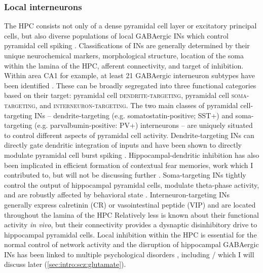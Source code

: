 \subsubsection{Local interneurons}
\label{sec:intro:memory:INs}
The \ac{HPC} consists not only of a dense pyramidal cell layer or excitatory principal cells, but also diverse populations of local GABAergic \ac{INs} which control pyramidal cell spiking \citep{Freund1996}.
Classifications of \ac{INs} are generally determined by their unique neurochemical markers, morphological structure, location of the soma within the lamina of the \ac{HPC}, afferent connectivity, and target of inhibition.
Within area CA1 for example, at least 21 GABAergic interneuron subtypes have been identified \citep{Klausberger2008}.
These can be broadly segregated into three functional categories based on their target: pyramidal cell \textsc{dendrite-targeting}, pyramidal cell \textsc{soma-targeting}, and \textsc{interneuron-targeting}.
The two main classes of pyramidal cell-targeting \ac{INs} -- dendrite-targeting (e.g. somatostatin-positive; SST+) and soma-targeting (e.g. parvalbumin-positive: PV+) interneurons -- are uniquely situated to control different aspects of pyramidal cell activity.
Dendrite-targeting \ac{INs} can directly gate dendritic integration of inputs and have been shown to directly modulate pyramidal cell burst spiking \citep{Royer2012}.
Hippocampal-dendritic inhibition has also been implicated in efficient formation of contextual fear memories, work which I contributed to, but will not be discussing further \citep{Lovett-Barron2014}.
Soma-targeting \ac{INs} tightly control the output of hippocampal pyramidal cells, modulate theta-phase activity, and are robustly affected by behavioral state \citep{Klausberger2008, Lovett-Barron2012, Klausberger2003}.
Interneuron-targeting \ac{INs} generally express calretinin (CR) or vasointestinal peptide (VIP) and are located throughout the lamina of the \ac{HPC} \citep{Chamberland2012}
Relatively less is known about their functional activity \emph{in vivo}, but their connectivity provides a dysnaptic disinhibitory drive to hippocampal pyramidal cells.
Local inhibition within the \ac{HPC} is essential for the normal control of network activity and the disruption of hippocampal GABAergic \ac{INs} has been linked to multiple psychological disorders \citep[reviewed in][]{Marin2012}, including \scz/ which I will discuss later (\autoref{sec:intro:scz:glutamate}).

